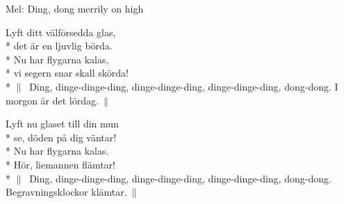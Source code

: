\begin{SongText}
    \begin{SongInfo}
        Mel: Ding, dong merrily on high
    \end{SongInfo}
    \begin{SongVerse}
        Lyft ditt välförsedda glas,\\*%
        det är en ljuvlig börda.\\*%
        Nu har flygarna kalas,\\*%
        vi segern snar skall skörda!\\*%
        $\|\:$ Ding, dinge-dinge-ding, dinge-dinge-ding, dinge-dinge-ding, dong-dong.
        I morgon är det lördag.$\:\|$
    \end{SongVerse}
    \begin{SongVerse}
        Lyft nu glaset till din mun\\*%
        se, döden på dig väntar!\\*%
        Nu har flygarna kalas.\\*%
        Hör, liemannen flämtar!\\*%
        $\|\:$ Ding, dinge-dinge-ding, dinge-dinge-ding, dinge-dinge-ding, dong-dong.
        Begravningsklockor klämtar.$\:\|$
    \end{SongVerse}
\end{SongText}

